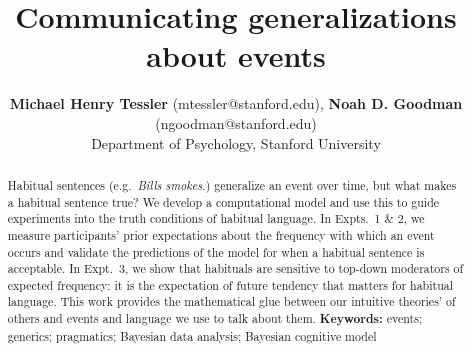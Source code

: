\documentclass[10pt,letterpaper]{article}
\title{Communicating generalizations about events}
\author{{\large \bf Michael Henry Tessler} (mtessler@stanford.edu), 
 {\large \bf Noah D. Goodman} (ngoodman@stanford.edu) \\
  Department of Psychology, Stanford University}
\newcommand{\ndg}[1]{\textcolor{Green}{[ndg: #1]}}
\begin{document}
\maketitle


\begin{abstract}
Habitual sentences (e.g.~\emph{Bills smokes.}) generalize an event over time, but what makes a habitual sentence true?
We develop a computational model and use this to guide experiments into the truth conditions of habitual language.
In Expts.~1 \& 2, we measure participants' prior expectations about the frequency with which an event occurs and validate the predictions of the model for when a habitual sentence is acceptable.
In Expt.~3, we show that habituals are sensitive to top-down moderators of expected frequency: it is the expectation of future tendency that matters for habitual language.
This work provides the mathematical glue between our intuitive theories' of others and events and language we use to talk about them.
\textbf{Keywords:} 
events; generics; pragmatics; Bayesian data analysis; Bayesian cognitive model
\end{abstract}
\end{document}
